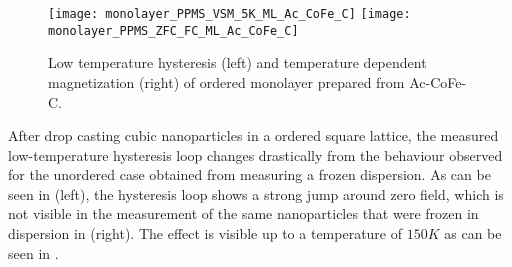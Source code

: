 \documentclass[\main/dresen_thesis.tex]{subfiles}
\begin{document}
  \begin{figure}[tb]
    \centering
    \texttt{[image: monolayer\_PPMS\_VSM\_5K\_ML\_Ac\_CoFe\_C]}
    \texttt{[image: monolayer\_PPMS\_ZFC\_FC\_ML\_Ac\_CoFe\_C]}
    \caption{\label{fig:monolayer:magneticStructure:ppms}Low temperature hysteresis (left) and temperature dependent magnetization (right) of ordered monolayer prepared from Ac-CoFe-C.}
  \end{figure}
  After drop casting cubic nanoparticles in a ordered square lattice, the measured low-temperature hysteresis loop changes drastically from the behaviour observed for the unordered case obtained from measuring a frozen dispersion.
  As can be seen in  (left), the hysteresis loop shows a strong jump around zero field, which is not visible in the measurement of the same nanoparticles that were frozen in dispersion in  (right).
  The effect is visible up to a temperature of $150 \unit{K}$ as can be seen in .
\end{document}

